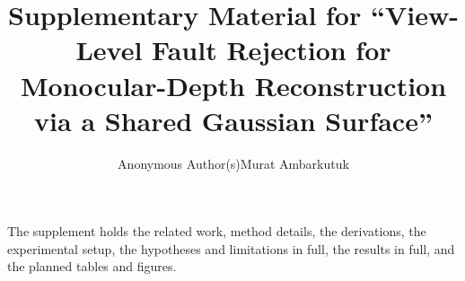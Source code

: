 \documentclass[letterpaper,journal,onecolumn]{IEEEtran}
\begin{document}
\title{Supplementary Material for ``View-Level Fault Rejection for Monocular-Depth Reconstruction via a
Shared Gaussian Surface''}
\author{\ifanonymous Anonymous Author(s)\else Murat Ambarkutuk\fi}
\maketitle

\renewcommand{\thesection}{S\arabic{section}}
\renewcommand{\thefigure}{S\arabic{figure}}
\renewcommand{\thetable}{S\arabic{table}}
\setcounter{section}{0}\setcounter{figure}{0}\setcounter{table}{0}
\noindent The supplement holds the related work, method details, the derivations, the experimental setup, the
hypotheses and limitations in full, the results in full, and the planned tables and figures.











\end{document}
